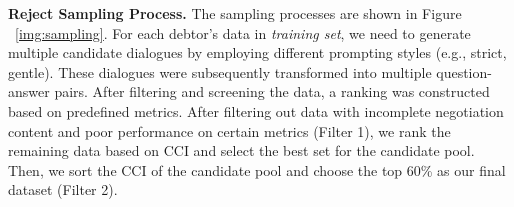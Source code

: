 \begin{table*}[ht]
    \centering
    \caption{\label{img:ftresult}Model performances on the test set under different handling methods}
 \label{tab:mainresults}
     \vspace{-10pt}
\end{table*}


\textbf{Reject Sampling Process. }The sampling processes are shown in Figure ~\ref{img:sampling}. For each debtor’s data in \textit{training set}, we need to generate multiple candidate dialogues by employing different prompting styles (e.g., strict, gentle). These dialogues were subsequently transformed into multiple question-answer pairs. After filtering and screening the data, a ranking was constructed based on predefined metrics. After filtering out data with incomplete negotiation content and poor performance on certain metrics (Filter 1), we rank the remaining data based on CCI and select the best set for the candidate pool. Then, we sort the CCI of the candidate pool and choose the top 60\% as our final dataset (Filter 2). 

